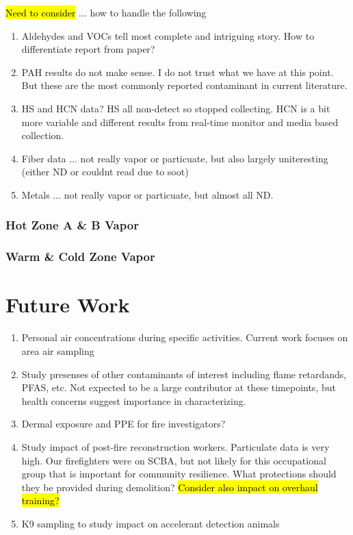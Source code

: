 \documentclass[12pt,oneside]{book}
\begin{document}
\hl{Need to consider} ... how to handle the following
\begin{enumerate}
\item Aldehydes and VOCs tell most complete and intriguing story.  How to differentiate report from paper?

\item PAH results do not make sense.  I do not trust what we have at this point.  But these are the most commonly reported contaminant in current literature.

\item HS and HCN data?  HS all non-detect so stopped collecting.  HCN is a bit more variable and different results from real-time monitor and media based collection. 

\item Fiber data ... not really vapor or particuate, but also largely uniteresting (either ND or couldnt read due to soot)

\item  Metals ... not really vapor or particuate, but almost all ND. 

\end{enumerate} 

\subsection{Hot Zone A \& B Vapor}
\label{subsec:HZvapor}

\subsection{Warm \& Cold Zone Vapor}
\label{subsec:WarmColdVapor}



\chapter{Future Work}

\begin{enumerate}
\item Personal air concentrations during specific activities.  Current work focuses on area air sampling

\item Study presenses of other contaminants of interest including flame retardands, PFAS, etc.  Not expected to be a large contributor at these timepoints, but health concerns suggest importance in characterizing.

\item Dermal exposure and PPE for fire investigators? 

\item Study impact of post-fire reconstruction workers.  Particulate data is very high.  Our firefighters were on SCBA, but not likely for this occupational group that is important for community resilience.  What protections should they be provided during demolition?  \hl{Consider also impact on overhaul training?}

\item  K9 sampling to study impact on accelerant detection animals

\end{enumerate} 
\end{document}
